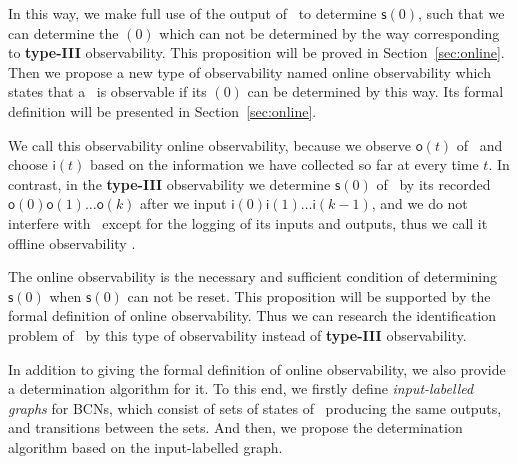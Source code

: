 

 In this way, we make full use of the output of \BCN\ to determine $\mathsf{s}(0)$, such that we can determine the \State$(0)$ which can not be determined by the way corresponding to {\bf type-III} observability. This proposition will be proved in Section~\ref{sec:online}. Then  we propose a new type of observability named online observability which states that a \BCN\ is observable if its \State$(0)$ can be determined by this way. Its formal definition will be presented in Section~\ref{sec:online}. 
 
 We call this observability online observability, because we observe $\mathsf{o}(t)$ of \BCN\ and choose $\mathsf{i}(t)$ based on the information we have collected so far at every time $t$. In contrast, in the {\bf type-III} observability we determine $\mathsf{s}(0)$ of \BCN\ by its recorded $\mathsf{o}(0)\mathsf{o}(1)\ldots\mathsf{o}(k)$ after we input $\mathsf{i}(0)\mathsf{i}(1)\ldots\mathsf{i}(k-1)$, and  we do not interfere with \BCN\ except for the logging of its inputs and outputs, thus we call it offline observability \cite{Cassar2017A}.
 
  The online observability is the necessary and sufficient condition of determining $\mathsf{s}(0)$ when $\mathsf{s}(0)$ can not be reset. This proposition will be supported by the formal definition of  online observability.  Thus we can research the identification problem of \BCNs\ by this type of observability instead of {\bf type-III} observability.




In addition to giving the formal definition of online observability, we also provide a determination algorithm for it. To this end, we firstly define {\em input-labelled graphs} for BCNs, which consist of sets of states of \BCNs\ producing the same outputs, and transitions between the sets. And then, we propose the determination algorithm based on the input-labelled graph.

